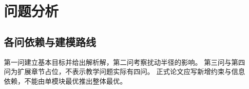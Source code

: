 \section{问题分析}
\subsection{各问依赖与建模路线}
第一问建立基本目标并给出解析解，第二问考察扰动半径的影响。
第三问与第四问为扩展章节占位，不表示教学问题实际有四问。
正式论文应写新增约束与信息依赖，不能由单模块最优推出整体最优。
